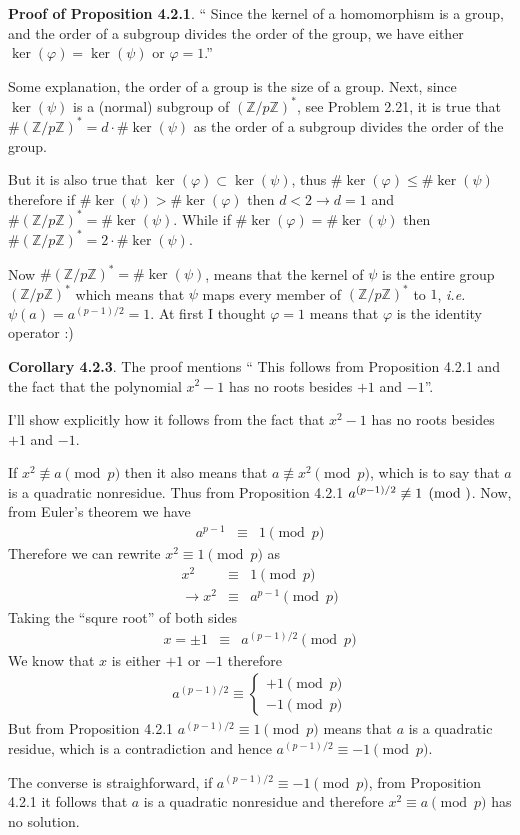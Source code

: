 \documentclass[aps,preprint,preprintnumbers,nofootinbib,showpacs,prd]{revtex4-1}
\newcommand{\ie}{{\it i.e.} }
\newcommand{\ba}{\begin{array}}
\newcommand{\ea}{\end{array}}
\newcommand{\nbea}{\begin{eqnarray*}}
\newcommand{\neea}{\end{eqnarray*}}
\begin{document}
{\bf Proof of Proposition 4.2.1}. `` Since the kernel of a homomorphism is a group, and the order of a subgroup divides the order of the group, we have either $\ker(\varphi) = \ker(\psi)$ or $\varphi = 1$.''

Some explanation, the order of a group is the size of a group. Next, since $\ker(\psi)$ is a (normal) subgroup of $(\mathbb{Z}/p\mathbb{Z})^*$, see Problem 2.21, it is true that $\#(\mathbb{Z}/p\mathbb{Z})^* = d \cdot \#\ker(\psi)$ as the order of a subgroup divides the order of the group.

But it is also true that $\ker(\varphi) \subset \ker(\psi)$, thus $\#\ker(\varphi) \le \#\ker(\psi)$ therefore if $\#\ker(\psi) > \#\ker(\varphi)$ then $d < 2 \to d = 1$ and $\#(\mathbb{Z}/p\mathbb{Z})^* = \#\ker(\psi)$. While if $\#\ker(\varphi) = \#\ker(\psi)$ then $\#(\mathbb{Z}/p\mathbb{Z})^* = 2 \cdot \#\ker(\psi)$.

Now $\#(\mathbb{Z}/p\mathbb{Z})^* = \#\ker(\psi)$, means that the kernel of $\psi$ is the entire group $(\mathbb{Z}/p\mathbb{Z})^*$ which means that $\psi$ maps every member of $(\mathbb{Z}/p\mathbb{Z})^*$ to $1$, \ie $\psi(a) = a^{(p-1)/2} = 1$. At first I thought $\varphi = 1$ means that $\varphi$ is the identity operator :)

{\bf Corollary 4.2.3}. The proof mentions `` This follows from Proposition 4.2.1 and the fact that the polynomial $x^2 - 1$ has no roots besides $+1$ and $-1$''.

I'll show explicitly how it follows from the fact that $x^2 - 1$ has no roots besides $+1$ and $-1$.

If $x^2 \not\equiv a \pmod{p}$ then it also means that $a \not\equiv x^2 \pmod{p}$, which is to say that $a$ is a quadratic nonresidue. Thus from Proposition 4.2.1 $a^{(p-1)/2} \not\equiv 1 \pmod$. Now, from Euler's theorem we have
%
\nbea
a^{p-1} & \equiv & 1 \pmod{p}
\neea
%
Therefore we can rewrite $x^2 \equiv 1 \pmod{p}$ as
%
\nbea
x^2 & \equiv & 1 \pmod{p} \\
\to x^2 & \equiv & a^{p-1} \pmod{p}
\neea
%
Taking the ``squre root'' of both sides
%
\nbea
x = \pm 1 & \equiv & a^{(p-1)/2} \pmod{p}
\neea
%
We know that $x$ is either $+1$ or $-1$ therefore 
%
\nbea
a^{(p-1)/2} \equiv \left \{ \ba{l}
+1 \pmod{p} \\
-1 \pmod{p}
\ea \right.
\neea
%
But from Proposition 4.2.1 $a^{(p-1)/2} \equiv 1 \pmod{p}$ means that $a$ is a quadratic residue, which is a contradiction and hence $a^{(p-1)/2} \equiv -1 \pmod{p}$.

The converse is straighforward, if $a^{(p-1)/2} \equiv -1 \pmod{p}$, from Proposition 4.2.1 it follows that $a$ is a quadratic nonresidue and therefore $x^2 \equiv a \pmod{p}$ has no solution.
\end{document}
